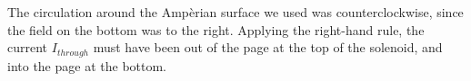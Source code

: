 The circulation around the Amp\`{e}rian surface we used
was counterclockwise, since the field on the bottom was to the right. Applying the
right-hand rule, the current $I_{through}$ must have been out of the page at the
top of the solenoid, and into the page at the bottom.
